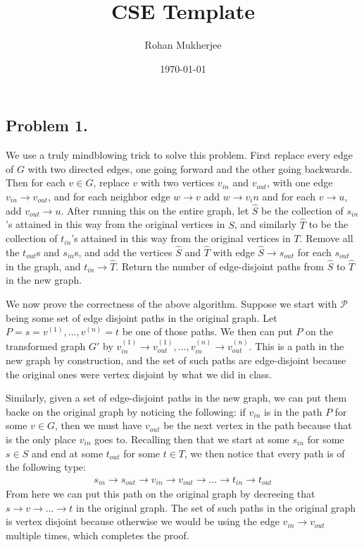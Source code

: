 \documentclass[12pt]{article}
\title{CSE Template}
\date{\today}
\author{Rohan Mukherjee}
\theoremstyle{definitionstyle}
\begin{document}
    \maketitle
    \subsection*{Problem 1.}
    We use a truly mindblowing trick to solve this problem. First replace every edge of $G$ with two directed edges, one going forward and the other going backwards. Then for each $v \in G$, replace $v$ with two vertices $v_{in}$ and $v_{out}$, with one edge $v_{in} \to v_{out}$, and for each neighbor edge $w \to v$ add $w \to v_in$ and for each $v \to u$, add $v_{out} \to u$. After running this on the entire graph, let $\hat S$ be the collection of $s_{in}$'s attained in this way from the original vertices in $S$, and similarly $\hat T$ to be  the collection of $t_{in}$'s attained in this way from the original vertices in $T$. Remove all the $t_{out}$s and $s_{in}$s, and add the vertices $\hat S$ and $\hat T$ with edge $\hat S \to s_{out}$ for each $s_{out}$ in the graph, and $t_{in} \to \hat T$. Return the number of edge-disjoint paths from $\hat S$ to $\hat T$ in the new graph.

    We now prove the correctness of the above algorithm. Suppose we start with $\mathscr{P}$ being some set of edge disjoint paths in the original graph. Let $P = s = v^{(1)}, \ldots, v^{(n)}= t$ be one of those paths. We then can put $P$ on the transformed graph $G'$ by $v^{(1)}_{in} \to v^{(1)}_{out}, \ldots, v^{(n)}_{in} \to v^{(n)}_{out}$. This is a path in the new graph by construction, and the set of such paths are edge-disjoint because the original ones were vertex disjoint by what we did in class. 

    Similarly, given a set of edge-disjoint paths in the new graph, we can put them backe on the original graph by noticing the following: if $v_{in}$ is in the path $P$ for some $v \in G$, then we must have $v_{out}$ be the next vertex in the path because that is the only place $v_{in}$ goes to. Recalling then that we start at some $s_{in}$ for some $s \in S$ and end at some $t_{out}$ for some $t \in T$, we then notice that every path is of the following type:
    \begin{align*}
        s_{in} \to s_{out} \to v_{in} \to v_{out} \to \ldots \to t_{in} \to t_{out}
    \end{align*}
    From here we can put this path on the original graph by decreeing that $s \to v \to \ldots \to t$ in the original graph. The set of such paths in the original graph is vertex disjoint because otherwise we would be using the edge $v_{in} \to v_{out}$ multiple times, which completes the proof.
\end{document}
